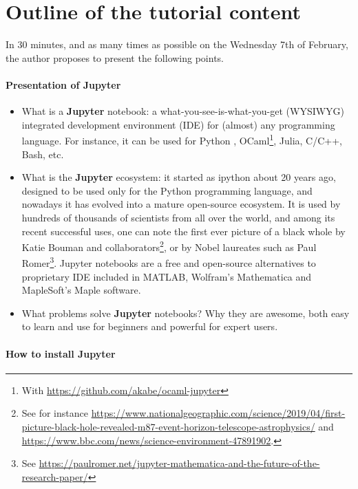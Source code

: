 \documentclass[runningheads]{llncs}
\newcommand{\Jupyter}{\textbf{Jupyter}}
\begin{document}
\section{Outline of the tutorial content}

In 30 minutes, and as many times as possible on the Wednesday 7th of February, the author proposes to present the following points.

\paragraph{Presentation of \Jupyter}

\begin{itemize}
    \item What is a \Jupyter{} notebook: a what-you-see-is-what-you-get (WYSIWYG) integrated development environment (IDE) for (almost) any programming language. For instance, it can be used for Python \cite{python}, OCaml\footnote{With \url{https://github.com/akabe/ocaml-jupyter}}, Julia, C/C++, Bash, etc.

    \item What is the \Jupyter{} ecosystem: it started as ipython \cite{ipython} about 20 years ago, designed to be used only for the Python programming language, and nowadays it has evolved into a mature open-source ecosystem.
    It is used by hundreds of thousands of scientists from all over the world, and among its recent successful uses, one can note the first ever picture of a black whole by Katie Bouman and collaborators\footnote{See for instance \url{https://www.nationalgeographic.com/science/2019/04/first-picture-black-hole-revealed-m87-event-horizon-telescope-astrophysics/} and \url{https://www.bbc.com/news/science-environment-47891902}.}, or by Nobel laureates such as Paul Romer\footnote{See \url{https://paulromer.net/jupyter-mathematica-and-the-future-of-the-research-paper/}}.
    Jupyter notebooks are a free and open-source alternatives to proprietary IDE included in MATLAB, Wolfram's Mathematica and MapleSoft's Maple software.

    \item What problems solve \Jupyter{} notebooks? Why they are awesome, both easy to learn and use for beginners and powerful for expert users.
\end{itemize}

\paragraph{How to install \Jupyter}
\end{document}
